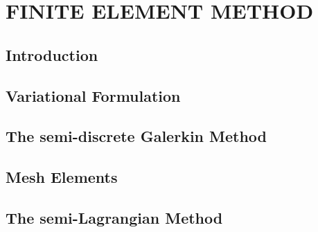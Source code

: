 \chapter{\textbf{FINITE ELEMENT METHOD}}
\label{metodo dos elementos finitos}

\section{\textbf{Introduction}} 


\section{\textbf{Variational Formulation}} 
\label{formulacao variacional}


\section{\textbf{The semi-discrete Galerkin Method}} 
\label{discretizacao espaco}


\section{\textbf{Mesh Elements}} 
\label{elemento}


\section{\textbf{The semi-Lagrangian Method}} 
\label{discretizacao tempo}




